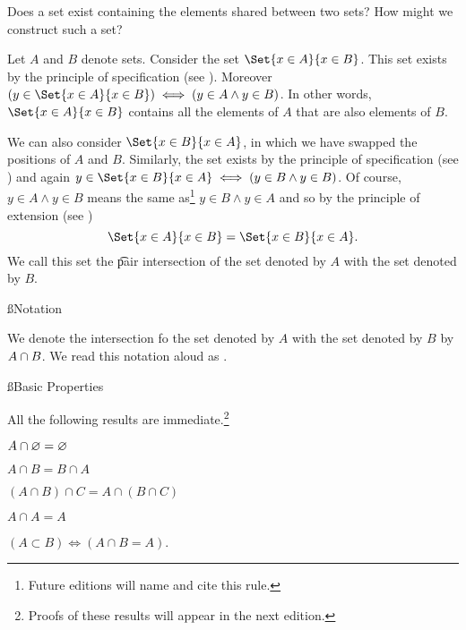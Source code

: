 

Does a set exist containing the elements shared between two sets?
How might we construct such a set?



Let $A$ and $B$ denote sets.
Consider the set $\Set{x \in A}{x \in B}$.
This set exists by the principle of specification (see ).
Moreover $(y \in \Set{x \in A}{x \in B}) \iff (y \in A \land y \in B)$.
In other words, $\Set{x \in A}{x \in B}$ contains all the elements of $A$ that are also elements of $B$.

We can also consider $\Set{x \in B}{x \in A}$, in which we have swapped the positions of $A$ and $B$.
Similarly, the set exists by the principle of specification (see ) and again $y \in \Set{x \in B}{x \in A} \iff (y \in B \land y \in B)$.
Of course, $y \in A \land y \in B$ means the same as\footnote{Future editions will name and cite this rule.} $y \in B \land y \in A$ and so by the principle of extension (see )
\[
	\Set{x \in A}{x \in B} = \Set{x \in B}{x \in A}.
\]
We call this set the \t{pair intersection} of the set denoted by $A$ with the set denoted by $B$.

\ss{Notation}

We denote the intersection fo the set denoted by $A$ with the set denoted by $B$ by $A \cap B$.
We read this notation aloud as .

\ss{Basic Properties}

All the following results are immediate.\footnote{Proofs of these results will appear in the next edition.}

\begin{proposition}
	$A \cap \varnothing = \varnothing$
\end{proposition}

\begin{proposition}[Commutativity]
	$A \cap B = B \cap A$
\end{proposition}

\begin{proposition}[Associativity]
	$(A \cap B) \cap C = A \cap (B \cap C)$
\end{proposition}

\begin{proposition}
	$A \cap A = A$
\end{proposition}

\begin{proposition}
	$(A \subset B) \iff (A \cap B = A)$.
\end{proposition}
